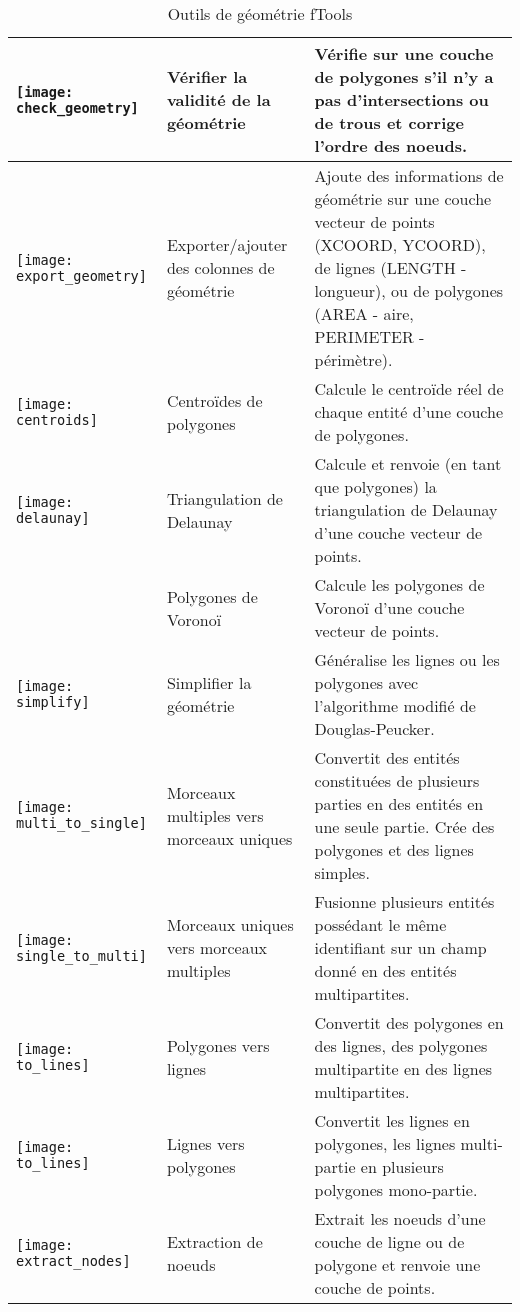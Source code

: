 \begin{table}[ht]
\begin{tabular}{|m{1cm}|m{3cm}|m{12cm}|}
 \hline \texttt{[image: check\_geometry]} & Vérifier la validité de la géométrie & Vérifie sur une couche de polygones s'il n'y a pas d'intersections ou de trous et corrige l'ordre des noeuds. \\
 \hline \texttt{[image: export\_geometry]} & Exporter/ajouter des colonnes de géométrie & Ajoute des informations de géométrie sur une couche vecteur de points (XCOORD, YCOORD), de lignes (LENGTH - longueur), ou de polygones (AREA - aire, PERIMETER - périmètre). \\
 \hline \texttt{[image: centroids]} & Centroïdes de polygones & Calcule le centroïde réel de chaque entité d'une couche de polygones. \\
 \hline \texttt{[image: delaunay]} & Triangulation de Delaunay & Calcule et renvoie (en tant que polygones) la triangulation de Delaunay d'une couche vecteur de points. \\
 \hline  &  Polygones de Voronoï & Calcule les polygones de Voronoï d'une couche vecteur de points. \\
 \hline \texttt{[image: simplify]} & Simplifier la géométrie & Généralise les lignes ou les polygones avec l'algorithme modifié de Douglas-Peucker. \\
 \hline \texttt{[image: multi\_to\_single]} & Morceaux multiples vers morceaux uniques & Convertit des entités constituées de plusieurs parties en des entités en une seule partie. Crée des polygones et des lignes simples. \\
 \hline \texttt{[image: single\_to\_multi]} & Morceaux uniques vers morceaux multiples & Fusionne plusieurs entités possédant le même identifiant sur un champ donné en des entités multipartites. \\
 \hline \texttt{[image: to\_lines]} & Polygones vers lignes & Convertit des polygones en des lignes, des polygones multipartite en des lignes multipartites. \\
 \hline \texttt{[image: to\_lines]} & Lignes vers polygones & Convertit les lignes en polygones, les lignes multi-partie en plusieurs polygones mono-partie. \\
 \hline \texttt{[image: extract\_nodes]} & Extraction de noeuds & Extrait les noeuds d'une couche de ligne ou de polygone et renvoie une couche de points. \\
 \hline
\end{tabular}
\caption{Outils de géométrie fTools}\label{tab:ftool_geometry}
\end{table}

